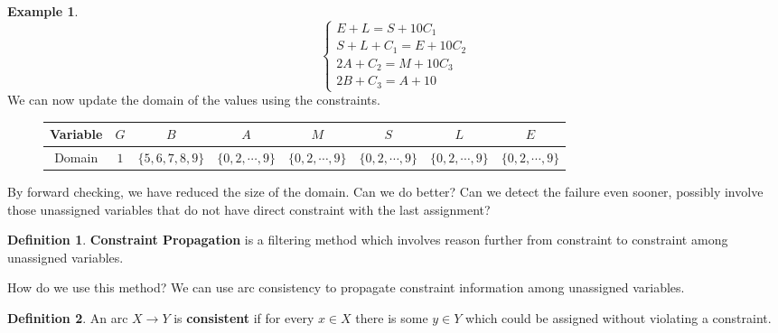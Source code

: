 \documentclass{article}
\theoremstyle{definition}
\newtheorem{definition}{Definition}[section]
\newtheorem{example}{Example}[definition]
\begin{document}
\begin{example}
\begin{equation*}
\begin{cases}
			E+L=S+10C_{1}\\
			S+L+C_{1}=E+10C_{2}\\
			2A+C_{2}=M+10C_{3}\\
			2B+C_{3}=A+10
		\end{cases}
	\end{equation*}
	We can now update the domain of the values using the constraints.
	\begin{figure}[h]
		\centering
		\begin{tabular}{|c||c|c|c|c|c|c|c|}
			\hline
			Variable & $G$ & $B$ & $A$ & $M$ & $S$ & $L$ & $E$\\
			\hline
			Domain & $1$ & $\{5,6,7,8,9\}$ & $\{0,2,\cdots,9\}$ & $\{0,2,\cdots,9\}$ & $\{0,2,\cdots,9\}$ & $\{0,2,\cdots,9\}$ & $\{0,2,\cdots,9\}$\\
			\hline
		\end{tabular}
	\end{figure}
\end{example}
By forward checking, we have reduced the size of the domain. Can we do better? Can we detect the failure even sooner, possibly involve those unassigned variables that do not have direct constraint with the last assignment?
\begin{definition}
	\textbf{Constraint Propagation} is a filtering method which involves reason further from constraint to constraint among unassigned variables.
\end{definition}
How do we use this method? We can use arc consistency to propagate constraint information among unassigned variables.
\begin{definition}
	An arc $X\to Y$ is \textbf{consistent} if for every $x\in X$ there is some $y\in Y$ which could be assigned without violating a constraint.
\end{definition}
\end{document}
